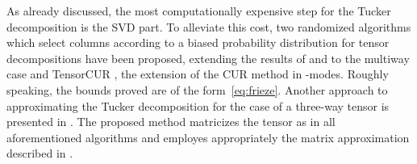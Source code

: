 As already discussed, the most computationally expensive step for the Tucker decomposition 
is the SVD part. To alleviate this cost, two randomized algorithms which select columns according to a biased probability 
distribution for tensor decompositions \cite{Drineas05arandomized} have been proposed, extending the results of \cite{1109681}and \cite{Drineas04fastmonte}
to the multiway case and TensorCUR \cite{DBLP:conf/kdd/MahoneyMD06}, the extension of the CUR method \cite{md-cmdid-2009} in -modes.
Roughly speaking, the bounds proved are of the form~\ref{eq:frieze}.
Another approach to approximating the Tucker decomposition for the case of a three-way tensor is presented in \cite{1461977}.
The proposed method matricizes the tensor as in all aforementioned algorithms and employes appropriately the 
matrix approximation described in \cite{goreinov}.
